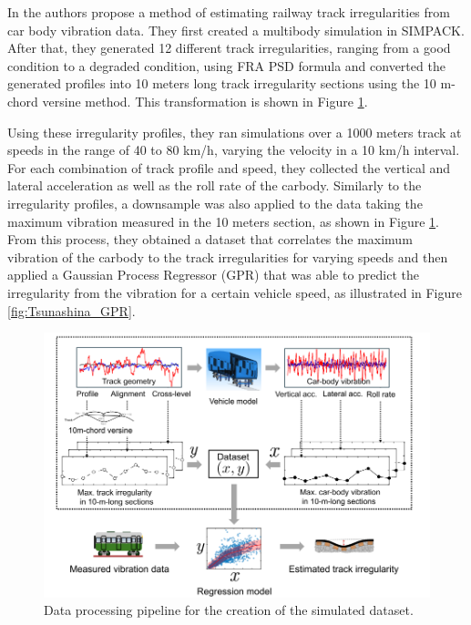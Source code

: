 In \cite{vibration7040049} the authors propose a method of estimating railway track irregularities from car body vibration data. They first created a multibody simulation in SIMPACK. After that, they generated 12 different track irregularities, ranging from a good condition to a degraded condition, using FRA PSD formula and converted the generated profiles into 10 meters long track irregularity sections using the 10 m-chord versine method. This transformation is shown in Figure \ref{fig:Tsunashina_data_process}.

Using these irregularity profiles, they ran simulations over a 1000 meters track at speeds in the range of 40 to 80 km/h, varying the velocity in a 10 km/h interval. For each combination of track profile and speed, they collected the vertical and lateral acceleration as well as the roll rate of the carbody. Similarly to the irregularity profiles, a downsample was also applied to the data taking the maximum vibration measured in the 10 meters section, as shown in Figure \ref{fig:Tsunashina_data_process}. From this process, they obtained a dataset that correlates the maximum vibration of the carbody to the track irregularities for varying speeds and then applied a Gaussian Process Regressor (GPR) that was able to predict the irregularity from the vibration for a certain vehicle speed, as illustrated in Figure \ref{fig:Tsunashina_GPR}. 


\begin{figure}[H]
    \centering
    \includegraphics[width=12cm]{Cap2_LitReview/Track_Quality_Accel/Tsunashina (2024)/data-process.png}
    \caption{Data processing pipeline for the creation of the simulated dataset. \cite{vibration7040049}}
    \label{fig:Tsunashina_data_process}
\end{figure}

